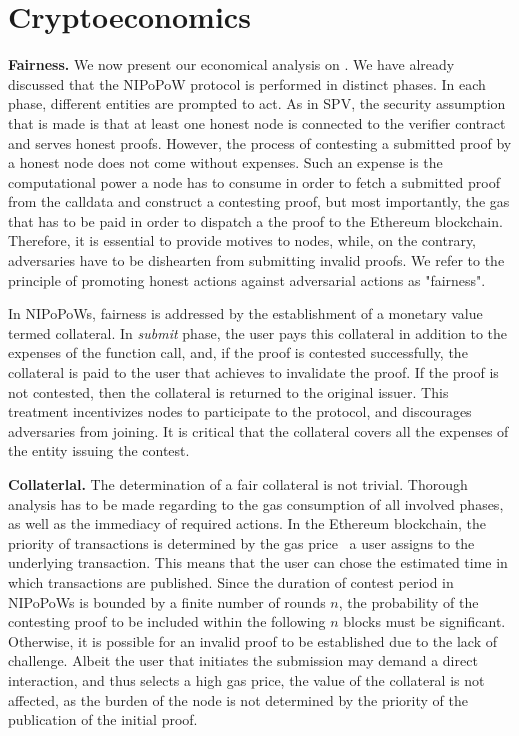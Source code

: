 \section{Cryptoeconomics}

\textbf{Fairness.} We now present our economical analysis on \name. We have
already discussed that the NIPoPoW protocol is performed in distinct phases. In
each phase, different entities are prompted to act. As in SPV, the security
assumption that is made is that at least one honest node is connected to the
verifier contract and serves honest proofs. However, the process of contesting
a submitted proof by a honest node does not come without expenses.  Such an
expense is the computational power a node has to consume in order to fetch a
submitted proof from the calldata and construct a contesting proof, but most
importantly, the gas that has to be paid in order to dispatch a the proof to
the Ethereum blockchain. Therefore, it is essential to provide motives to
nodes, while, on the contrary, adversaries have to be dishearten from
submitting invalid proofs.  We refer to the principle of promoting honest
actions against adversarial actions as {"}fairness{"}.

In NIPoPoWs, fairness is addressed by the establishment of a monetary value
termed collateral. In \emph{submit} phase, the user pays this collateral in
addition to the expenses of the function call, and, if the proof is contested
successfully, the collateral is paid to the user that achieves to invalidate
the proof. If the proof is not contested, then the collateral is returned to
the original issuer. This treatment incentivizes nodes to participate to the
protocol, and discourages adversaries from joining. It is critical that the
collateral covers all the expenses of the entity issuing the contest.

\noindent \textbf{Collaterlal.} The determination of a fair collateral is not
trivial. Thorough analysis has to be made regarding to the gas consumption of
all involved phases, as well as the immediacy of required actions. In the
Ethereum blockchain, the priority of transactions is determined by the gas
price~\cite{wood} a user assigns to the underlying transaction. This means that
the user can chose the estimated time in which transactions are published.
Since the duration of contest period in NIPoPoWs is bounded by a finite number
of rounds $n$, the probability of the contesting proof to be included within the
following $n$ blocks must be significant. Otherwise, it is possible for an invalid
proof to be established due to the lack of challenge. Albeit the user that
initiates the submission may demand a direct interaction, and thus selects a
high gas price, the value of the collateral is not affected, as the burden
of the node is not determined by the priority of the publication of the initial
proof.

